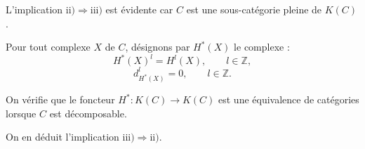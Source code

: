 L'implication $\mathrm{ii)}\Longrightarrow\mathrm{iii)}$ est évidente car
$C$ est une sous-catégorie pleine de $K(C)$.

Pour tout complexe $X$ de $C$, désignons par $H^*(X)$ le complexe :
\[
  H^*(X)^l=H^l(X),\qquad l\in\mathbb Z,
\]
\[
  d_{H^*(X)}^l=0,\qquad l\in\mathbb Z.
\]

On vérifie que le foncteur
$H^*\colon K(C)\longrightarrow K(C)$ est une équivalence de catégories
lorsque $C$ est décomposable.

On en déduit l'implication
$\mathrm{iii)}\Longrightarrow\mathrm{ii)}$.
\endgroup
